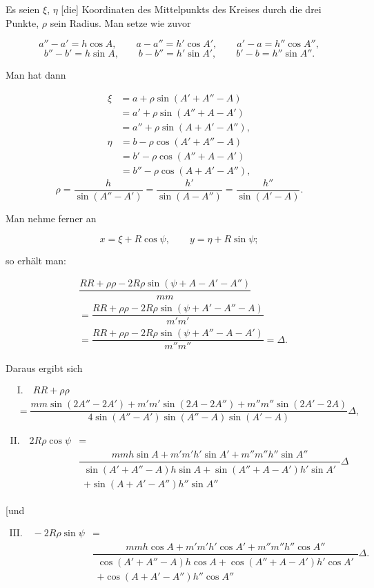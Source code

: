 

Es seien $\xi$, $\eta$ [die] Koordinaten des Mittelpunkts des Kreises durch die drei Punkte, $\rho$ sein Radius. Man setze wie zuvor

\[
a'' - a' = h\cos A, \qquad a - a'' = h'\cos A', \qquad a' - a = h''\cos A'',
\]
\[
b'' - b' = h\sin A, \qquad b - b'' = h'\sin A', \qquad b' - b = h''\sin A''.
\]

Man hat dann

\[
\begin{aligned}
\xi &= a + \rho\sin(A'+A''-A)\\ &= a' + \rho\sin(A''+A-A')\\ &= a'' + \rho\sin(A+A'-A''),
\end{aligned}
\]
\[
\begin{aligned}
\eta &= b - \rho\cos(A'+A''-A)\\ &= b' - \rho\cos(A''+A-A')\\ &= b'' - \rho\cos(A+A'-A''),
\end{aligned}
\]
\[
\rho = \dfrac{h}{\sin(A''-A')} = \dfrac{h'}{\sin(A-A'')} = \dfrac{h''}{\sin(A'-A)}.
\]

\begin{center}\end{center}

Man nehme ferner an

\[
x = \xi + R\cos\psi, \qquad y = \eta + R\sin\psi;
\]

so erhält man:

\[
\begin{aligned}
&\dfrac{RR+\rho\rho-2R\rho\sin(\psi+A-A'-A'')}{mm}\\ &= \dfrac{RR+\rho\rho-2R\rho\sin(\psi+A'-A''-A)}{m'm'}\\ &= \dfrac{RR+\rho\rho-2R\rho\sin(\psi+A''-A-A')}{m''m''} = \Delta.
\end{aligned}
\]

Daraus ergibt sich

\[
\begin{aligned}&\mathrm{I.}\quad RR+\rho\rho\\ &=\dfrac{mm\sin(2A''-2A')+m'm'\sin(2A-2A'')+m''m''\sin(2A'-2A)}{4\sin(A''-A')\sin(A''-A)\sin(A'-A)}\Delta,\end{aligned}
\]

\[
\begin{aligned}\mathrm{II.}\quad 2R\rho\cos\psi&=\\ &\dfrac{mmh\sin A+m'm'h'\sin A'+m''m''h''\sin A''}{\substack{\sin(A'+A''-A)h\sin A+\sin(A''+A-A')h'\sin A'\\+\sin(A+A'-A'')h''\sin A''}}\Delta\end{aligned}
\]

[und

\[
\begin{aligned}\mathrm{III.}\quad -2R\rho\sin\psi&=\\ &\dfrac{mmh\cos A+m'm'h'\cos A'+m''m''h''\cos A''}{\substack{\cos(A'+A''-A)h\cos A+\cos(A''+A-A')h'\cos A'\\+\cos(A+A'-A'')h''\cos A''}}\Delta.\end{aligned}
\]
